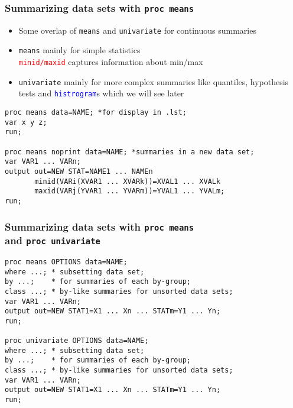 \documentclass[11pt,pdftex,dvipsnames,usenames,helvetica]{beamer}
\begin{document}
\begin{frame}[fragile]
\frametitle{Summarizing data sets with {\tt proc means}}
\begin{itemize}
\item Some overlap of {\tt means} and {\tt univariate}
for continuous summaries
\item {\tt means} mainly for simple statistics\\
\textcolor{red}{{\tt minid/maxid}} captures information about min/max
\item {\tt univariate} mainly for more complex summaries
like quantiles, hypothesis tests and \textcolor{blue}{\tt histrogram}s
which we will see later 
\end{itemize}
\begin{verbatim}
proc means data=NAME; *for display in .lst;
var x y z;
run;

proc means noprint data=NAME; *summaries in a new data set;
var VAR1 ... VARn;
output out=NEW STAT=NAME1 ... NAMEn
       minid(VARi(XVAR1 ... XVARk))=XVAL1 ... XVALk
       maxid(VARj(YVAR1 ... YVARm))=YVAL1 ... YVALm;
run;
\end{verbatim}

\end{frame}

\begin{frame}[fragile]
\frametitle{Summarizing data sets with {\tt proc means}\\
and {\tt proc univariate}}
\begin{verbatim}
proc means OPTIONS data=NAME;
where ...; * subsetting data set;
by ...;    * for summaries of each by-group;
class ...; * by-like summaries for unsorted data sets;
var VAR1 ... VARn;
output out=NEW STAT1=X1 ... Xn ... STATm=Y1 ... Yn;
run;

proc univariate OPTIONS data=NAME;
where ...; * subsetting data set;
by ...;    * for summaries of each by-group;
class ...; * by-like summaries for unsorted data sets;
var VAR1 ... VARn;
output out=NEW STAT1=X1 ... Xn ... STATm=Y1 ... Yn;
run;
\end{verbatim}

\end{frame}
\end{document}
